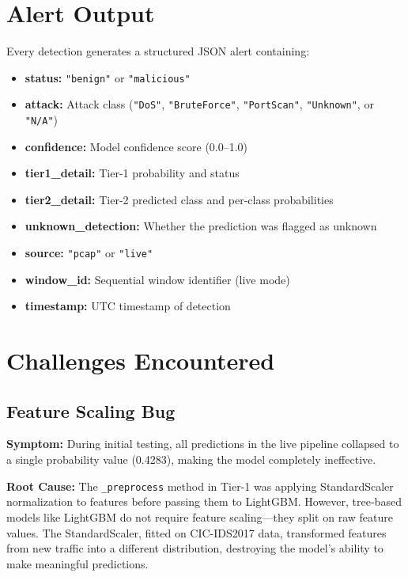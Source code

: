 \documentclass[12pt,a4paper,twoside]{report}
\begin{document}
\section{Alert Output}

Every detection generates a structured JSON alert containing:

\begin{itemize}
    \item \textbf{status:} \texttt{"benign"} or \texttt{"malicious"}
    \item \textbf{attack:} Attack class (\texttt{"DoS"}, \texttt{"BruteForce"}, \texttt{"PortScan"}, \texttt{"Unknown"}, or \texttt{"N/A"})
    \item \textbf{confidence:} Model confidence score (0.0--1.0)
    \item \textbf{tier1\_detail:} Tier-1 probability and status
    \item \textbf{tier2\_detail:} Tier-2 predicted class and per-class probabilities
    \item \textbf{unknown\_detection:} Whether the prediction was flagged as unknown
    \item \textbf{source:} \texttt{"pcap"} or \texttt{"live"}
    \item \textbf{window\_id:} Sequential window identifier (live mode)
    \item \textbf{timestamp:} UTC timestamp of detection
\end{itemize}

\section{Challenges Encountered}

\subsection{Feature Scaling Bug}

\textbf{Symptom:} During initial testing, all predictions in the live pipeline collapsed to a single probability value (0.4283), making the model completely ineffective.

\textbf{Root Cause:} The \texttt{\_preprocess} method in Tier-1 was applying StandardScaler normalization to features before passing them to LightGBM. However, tree-based models like LightGBM do not require feature scaling—they split on raw feature values. The StandardScaler, fitted on CIC-IDS2017 data, transformed features from new traffic into a different distribution, destroying the model's ability to make meaningful predictions.
\end{document}
